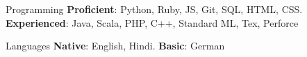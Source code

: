 

\begin{cvskills}

  \cvskill
    {Programming} %
    {\textbf{Proficient}: Python, Ruby, JS, Git, SQL, HTML, CSS.} %
    {\textbf{Experienced}: Java, Scala, PHP, C++, Standard ML, Tex, Perforce}

  \cvskill
    {Languages} %
    {\textbf{Native}: English, Hindi.} %
    {\textbf{Basic}: German}

\end{cvskills}
